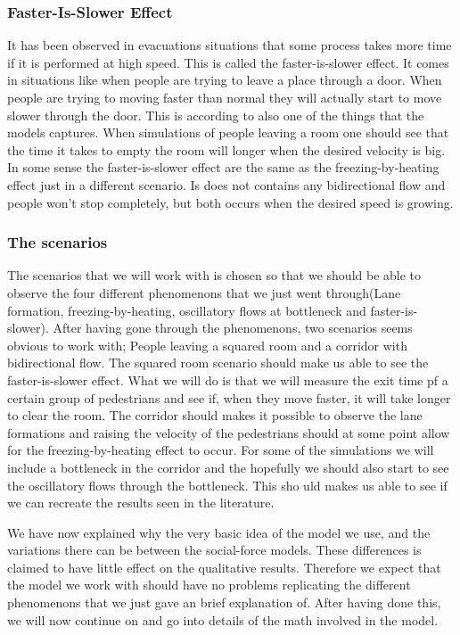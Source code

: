 \subsubsection{Faster-Is-Slower Effect}
It has been observed in evacuations situations that some process takes more 
time if it is performed at high speed. This is called the faster-is-slower effect. It comes in situations like when people are trying to leave a place through a door. When people are trying to moving faster than normal they will actually start to move slower through the door. This is according to \cite{self-org} also one of the things that the models captures. When simulations of people leaving a room one should see that the time it takes to empty the room will longer when the desired velocity is big.  In some sense the faster-is-slower effect are the same as the freezing-by-heating effect just in a different scenario. Is does not contains any bidirectional flow and people won't stop completely, but both occurs when the desired speed is growing. 

\subsubsection{The scenarios}
The scenarios that we will work with is chosen so that we should be able to observe the four different phenomenons that we just went through(Lane formation, freezing-by-heating, oscillatory flows at bottleneck and faster-is-slower). After having gone through the phenomenons, two scenarios seems obvious to work with; People leaving a squared room and a corridor with bidirectional flow. The squared room scenario should make us able to see the faster-is-slower effect. What we will do is that we will measure the exit time pf a certain group of pedestrians and see if, when they move faster, it will take longer to clear the room. The corridor should makes it possible to observe the lane formations and raising the velocity of the pedestrians should at some point allow for the freezing-by-heating effect to occur. For some of the simulations we will include a bottleneck in the corridor and the hopefully we should also start to see the oscillatory flows through the bottleneck. This sho
 uld makes us able to see if we can recreate the results seen in the literature.   


 We have now explained why the very basic idea of the model we use, and the variations there can be between the social-force models. These differences is claimed to have little effect on the qualitative results. Therefore we expect that the model we work with should have no problems replicating the different phenomenons that we just gave an brief explanation of. After having done this, we will now continue on and go into details of the math involved in the model. 

